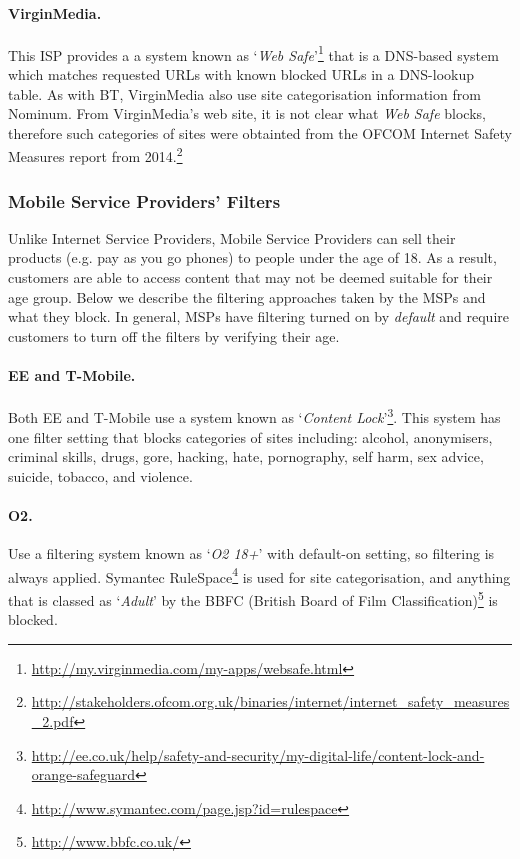 \documentclass{bmcart}
\begin{document}
\paragraph{VirginMedia.} 
This ISP provides a a system known as `\textit{Web Safe}'\footnote{\url{http://my.virginmedia.com/my-apps/websafe.html}} that is a DNS-based system which matches requested URLs with known blocked URLs in a DNS-lookup table.
As with BT, VirginMedia also use site categorisation information from Nominum.
From VirginMedia's web site, it is not clear what \textit{Web Safe} blocks, therefore such categories of sites were obtainted from the OFCOM Internet Safety Measures report from 2014.\footnote{\url{http://stakeholders.ofcom.org.uk/binaries/internet/internet_safety_measures_2.pdf}}


\subsubsection*{Mobile Service Providers' Filters}
Unlike Internet Service Providers, Mobile Service Providers can sell their products (e.g. pay as you go phones) to people under the age of 18.
As a result, customers are able to access content that may not be deemed suitable for their age group.
Below we describe the filtering approaches taken by the MSPs and what they block.
In general, MSPs have filtering turned on by \textit{default} and require customers to turn off the filters by verifying their age.

\paragraph{EE and T-Mobile.}
Both EE and T-Mobile use a system known as `\textit{Content Lock}'\footnote{\url{http://ee.co.uk/help/safety-and-security/my-digital-life/content-lock-and-orange-safeguard}}.
This system has one filter setting that blocks categories of sites including: alcohol, anonymisers, criminal skills, drugs, gore, hacking, hate, pornography, self harm, sex advice, suicide, tobacco, and violence.

\paragraph{O2.}
Use a filtering system known as `\textit{O2 18+}' with default-on setting, so filtering is always applied.
Symantec RuleSpace\footnote{\url{http://www.symantec.com/page.jsp?id=rulespace}} is used for site categorisation, and anything that is classed as `\textit{Adult}' by the BBFC (British Board of Film Classification)\footnote{\url{http://www.bbfc.co.uk/}} is blocked.
\end{document}
